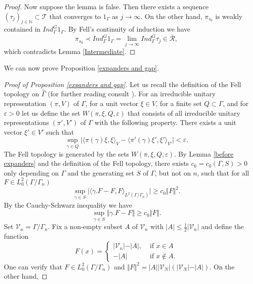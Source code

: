 \documentclass[12pt]{article}
\newcommand{\NN}{\mathbb{N}}
\begin{document}
\begin{proof}
Now suppose the lemma is false. Then there exists a sequence $ (\tau_{j})_{j\in \NN} \subset \mathcal{T} $ that converges to $ 1_{\Gamma} $ as $ j\to \infty $. On the other hand, $ \pi_{s_{0}} $ is weakly contained in $ Ind_{\Gamma}^{G} 1_{\Gamma} $. By Fell's continuity of induction \cite{fell} we have 
$$ \pi_{s_{0}} \prec Ind_{\Gamma}^{G} 1_{\Gamma} = \lim_{j\to \infty} Ind_{\Gamma}^{G} \tau_{j} \in \overline{\mathcal{R}},   $$
which contradicts Lemma \ref{Intermediate}.
\end{proof}

We can now prove Proposition \ref{expanders and gap}.

\begin{proof}[Proof of Proposition \ref{expanders and gap}]
Let us recall the definition of the Fell topology on $ \hat{\Gamma} $ (for further reading consult \cite[Chapter~F]{Property(T)}). For an irreducible unitary representation $ (\pi, V) $ of $ \Gamma $, for a unit vector $ \xi\in V $, for a finite set $ Q\subset \Gamma $, and for $ \varepsilon > 0 $ let us define the set  $ W(\pi, \xi, Q, \varepsilon) $ that consists of all irreducible unitary representations $ (\pi', V') $ of $ \Gamma $ with the following property. There exists a unit vector $ \xi'\in V' $ such that
$$ \sup_{\gamma\in Q} \vert \langle \pi(\gamma)\xi, \xi\rangle_{V} - \langle \pi'(\gamma)\xi', \xi'\rangle_{V'} \vert < \varepsilon. $$
The Fell topology is generated by the sets $ W(\pi, \xi, Q, \varepsilon) $. By Lemma \ref{before expanders} and the definition of the Fell topology, there exists $ c_{0} = c_{0}(\Gamma, S) > 0 $ only depending on $ \Gamma $ and the generating set $ S $ of $ \Gamma $, but not on $ n $, such that for all $ F\in L_{0}^{2}(\Gamma/\Gamma_{n}) $
\begin{equation}\label{Implication}
\sup_{\gamma\in S} \vert \langle \gamma.F - F, F \rangle_{L^{2}(\Gamma/\Gamma_{n})}  \vert  \geq c_{0}\Vert F\Vert^{2}.
\end{equation}
By the Cauchy-Schwarz inequality we have 
$$ \sup_{\gamma\in S}\Vert \gamma .F - F \Vert  \geq c_{0}\Vert F\Vert. $$
Set $ \mathcal{V}_{n} = \Gamma/\Gamma_{n} $. Fix a non-empty subset $ A $ of $ \mathcal{V}_{n} $ with $ \vert A\vert \leq \frac{1}{2}\vert\mathcal{V}_{n}\vert $ and define the function
$$ F(x) = 
\begin{cases}
\vert \mathcal{V}_{n}\vert - \vert A\vert, & \text{ if } x\in A\\
-\vert A\vert & \text{ if } x\notin A.
\end{cases}
$$
One can verify that $ F\in L_{0}^{2}(\Gamma/\Gamma_{n}) $ and $ \Vert F\Vert^{2} = \vert A\vert\vert \mathcal{V}_{N} \vert (\vert \mathcal{V}_{N}\vert - \vert A\vert). $ On the other hand,

\end{proof}
\end{document}
